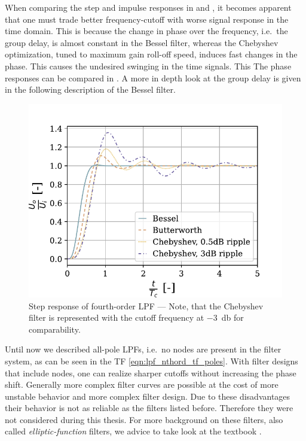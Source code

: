 When comparing the step and impulse responses in  and , it becomes apparent that one must trade better frequency-cutoff with worse signal response in the time domain. This is because the change in phase over the frequency, i.e.\ the group delay, is almost constant in the Bessel filter, whereas the Chebyshev optimization, tuned to maximum gain roll-off speed, induces fast changes in the phase. This causes the undesired swinging in the time signals. This The phase responses can be compared in . A more in depth look at the group delay is given in the following description of the Bessel filter.

\begin{figure}[!htb]
  \centering
  \includegraphics[scale=0.72]{figures/electronics/lowpass/lp_filter_4ord_step}
  \caption[Step response of fourth-order \ac{LPF}]{Step response of fourth-order \ac{LPF} --- Note, that the Chebyshev filter is represented with the cutoff frequency at \SI{-3}{\decibel} for comparability.%
    \label{fig:lp_filter_4ord_step}}
\end{figure}

Until now we described all-pole \ac{LPF}s, i.e.\ no nodes are present in the filter system, as can be seen in the \ac{TF} \eqref{eqn:lpf_nthord_tf_poles}. With filter designs that include nodes, one can realize sharper cutoffs without increasing the phase shift. Generally more complex filter curves are possible at the cost of more unstable behavior and more complex filter design. Due to these disadvantages their behavior is not as reliable as the filters listed before. Therefore they were not considered during this thesis. For more background on these filters, also called \emph{elliptic-function} filters, we advice to take look at the textbook \cite{williams2014analog}.

